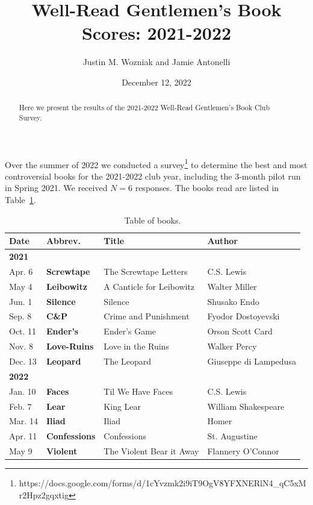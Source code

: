 \documentclass{article}
\newcommand{\B}[1]{\textbf{#1}}
\newcommand{\TABLE}[1]{Table~\ref{table:#1}}
\begin{document}
\title{Well-Read Gentlemen's Book Scores: 2021-2022}
\author{Justin M. Wozniak and Jamie Antonelli}
\date{December 12, 2022}

\onehalfspacing

\maketitle

\begin{abstract}
\noindent Here we present the results of the 2021-2022 Well-Read Gentlemen's Book Club Survey.
\end{abstract}

\noindent Over the summer of 2022 we conducted a survey\footnote{
{\sffamily https://docs.google.com/forms/d/1cYvzmk2i9iT9OgV8YFXNERlN4\_qC5xMr2Hpz2gqxtig}} to determine the best and most controversial books for the 2021-2022 club year, including the 3-month pilot run in Spring 2021.
We received $N=6$ responses.  The books read are listed in \TABLE{books}.

\begin{table}
  \begin{tabular}{llll}
    \B{Date} & \B{Abbrev.} & \B{Title} & \B{Author} \\ \hline \hline
    \B{2021} & & & \\
    Apr.  6  & \B{Screwtape} & The Screwtape Letters & C.S. Lewis \\
    May   4  & \B{Leibowitz} & A Canticle for Leibowitz & Walter Miller \\
    Jun.  1  & \B{Silence} & Silence & Shusako Endo \\
    Sep.  8  & \B{C\&P} & Crime and Punishment & Fyodor Dostoyevski \\
    Oct. 11  & \B{Ender's} &  Ender's Game & Orson Scott Card \\
    Nov.  8  & \B{Love-Ruins} & Love in the Ruins & Walker Percy \\
    Dec. 13  & \B{Leopard} & The Leopard & Giuseppe di Lampedusa \\
    \B{2022} & & & \\
    Jan. 10  & \B{Faces} & Til We Have Faces & C.S. Lewis \\
    Feb.  7  & \B{Lear} & King Lear & William Shakespeare \\
    Mar. 14  & \B{Iliad} & Iliad & Homer \\
    Apr. 11  & \B{Confessions} & Confessions & St. Augustine \\
    May   9  & \B{Violent} & The Violent Bear it Away & Flannery O'Connor \\
  \end{tabular}
  \caption{Table of books. \label{table:books}}
\end{table}
\end{document}
